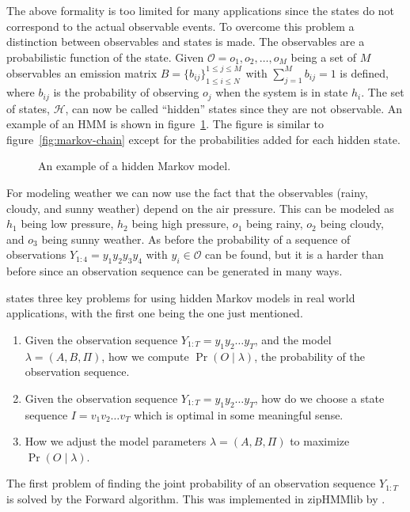 The above formality is too limited for many applications since the states do
not correspond to the actual observable events. To overcome this problem a
distinction between observables and states is made. The observables are a
probabilistic function of the state. Given
$\mathcal{O} = {o_1, o_2, \dots, o_M}$ being a set of $M$ observables an
emission matrix $B = {\{b_{ij}\}}_{1 \le i \le N}^{1 \le j \le M}$ with
$\sum_{j=1}^M b_{ij} = 1$ is defined, where $b_{ij}$ is the probability of
observing $o_j$ when the system is in state $h_i$. The set of states,
$\mathcal{H}$, can now be called ``hidden'' states since they are not
observable. An example of an HMM is shown in
figure~\ref{fig:hidden-markov-model}. The figure is similar to
figure~\ref{fig:markov-chain} except for the probabilities added for each
hidden state.

\begin{figure}
  \centering
  
  \caption{An example of a hidden Markov model.}
  \label{fig:hidden-markov-model}
\end{figure}

For modeling weather we can now use the fact that the observables (rainy,
cloudy, and sunny weather) depend on the air pressure. This can be modeled as
$h_1$ being low pressure, $h_2$ being high pressure, $o_1$ being rainy, $o_2$
being cloudy, and $o_3$ being sunny weather. As before the probability of a
sequence of observations $Y_{1:4} = y_1y_2y_3y_4$ with $y_i \in \mathcal{O}$
can be found, but it is a harder than before since an observation sequence can be
generated in many ways.

\citet{rabiner1989tutorial} states three key problems for using hidden Markov
models in real world applications, with the first one being the one just
mentioned.
\begin{enumerate}
\item Given the observation sequence $Y_{1:T} = y_1y_2\dots{}y_T$, and the
  model $\lambda = (A, B, \Pi)$, how we compute $\Pr(O \mid \lambda)$, the
  probability of the observation sequence.
\item Given the observation sequence $Y_{1:T} = y_1y_2\dots{}y_T$, how do we
  choose a state sequence $I = v_1v_2\dots{}v_T$ which is optimal in some
  meaningful sense.
\item How we adjust the model parameters $\lambda = (A, B, \Pi)$ to maximize
  $\Pr(O \mid \lambda)$.
\end{enumerate}

The first problem of finding the joint probability of an observation sequence
$Y_{1:T}$ is solved by the Forward algorithm. This was implemented in zipHMMlib
by \citet{sand2013ziphmmlib}.

